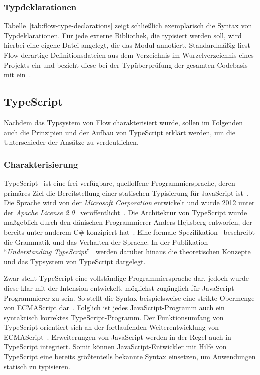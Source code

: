 

\subsubsection{Typdeklarationen}
\label{sec:type-declarations}

Tabelle~\ref{tab:flow-type-declarations} zeigt schließlich exemplarisch die Syntax von Typdeklarationen. Für jede externe Bibliothek, die typisiert werden soll, wird hierbei eine eigene Datei angelegt, die das Modul annotiert. Standardmäßig liest Flow derartige Definitionsdateien aus dem Verzeichnis  im Wurzelverzeichnis eines Projekts ein und bezieht diese bei der Typüberprüfung der gesamten Codebasis mit ein~\autocite{FLOW:LIBRARY_DEFINITIONS}.



\subsection{TypeScript}
\label{sec:typescript}

Nachdem das Typsystem von Flow charakterisiert wurde, sollen im Folgenden auch die Prinzipien und der Aufbau von TypeScript erklärt werden, um die Unterschieder der Ansätze zu verdeutlichen.

\subsubsection{Charakterisierung}

TypeScript~\autocite{TYPESCRIPT:SPEC} ist eine frei verfügbare, quelloffene Programmiersprache, deren primäres Ziel die Bereitstellung einer statischen Typisierung für JavaScript ist~\autocite[2]{BIERMAN:2014}. Die Sprache wird von der \textit{Microsoft Corporation} entwickelt und wurde 2012 unter der \textit{Apache License 2.0}~\autocite{LICENSE:APACHE20} veröffentlicht~\autocite{TYPESCRIPT:GITHUB}. Die Architektur von TypeScript wurde maßgeblich durch den dänischen Programmierer Anders Hejlsberg entworfen, der bereits unter anderem C\# konzipiert hat~\autocite{GITHUB:HEJLSBERG}. Eine formale Spezifikation~\autocite{TYPESCRIPT:SPEC} beschreibt die Grammatik und das Verhalten der Sprache. In der Publikation \enquote{\textit{Understanding TypeScript}}~\autocite{BIERMAN:2014} werden darüber hinaus die theoretischen Konzepte und das Typsystem von TypeScript dargelegt.

Zwar stellt TypeScript eine vollständige Programmiersprache dar, jedoch wurde diese klar mit der Intension entwickelt, möglichst zugänglich für JavaScript-Programmierer zu sein. So stellt die Syntax beispielsweise eine strikte Obermenge von ECMAScript dar~\autocite[25]{FLOW:PAPER}. Folglich ist jedes JavaScript-Programm auch ein syntaktisch korrektes TypeScript-Programm. Der Funktionsumfang von TypeScript orientiert sich an der fortlaufenden Weiterentwicklung von ECMAScript~\autocite[1]{BIERMAN:2014}. Erweiterungen von JavaScript werden in der Regel auch in TypeScript integriert. Somit können JavaScript-Entwickler mit Hilfe von TypeScript eine bereits größtenteils bekannte Syntax einsetzen, um Anwendungen statisch zu typisieren.

